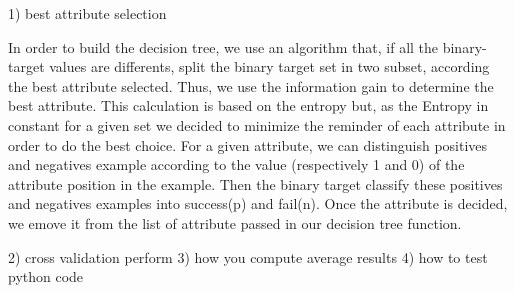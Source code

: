 1) best attribute selection


In order to build the decision tree, we use an algorithm that, if all the binary-target values are differents, split the binary target set in two subset, according the best attribute selected. Thus, we use the information gain to determine the best attribute. This calculation is based on the entropy but, as the Entropy in constant for a given set we decided to minimize the reminder of each attribute in order to do the best choice. For a given attribute, we can distinguish positives and negatives example according to the value (respectively 1 and 0) of the attribute position in the example. Then the binary target classify these positives and negatives examples into success(p) and fail(n). Once the attribute is decided, we emove it from the list of attribute passed in our decision tree function.

2) cross validation perform
3) how you compute average results
4) how to test python code

